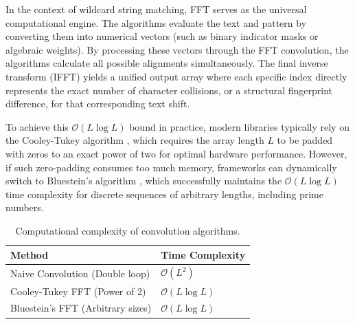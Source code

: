 In the context of wildcard string matching, FFT serves as the universal computational engine. The algorithms evaluate the text and pattern by converting them into numerical vectors (such as binary indicator masks or algebraic weights). By processing these vectors through the FFT convolution, the algorithms calculate all possible alignments simultaneously. The final inverse transform (IFFT) yields a unified output array where each specific index directly represents the exact number of character collisions, or a structural fingerprint difference, for that corresponding text shift.

To achieve this $\mathcal{O}(L \log L)$ bound in practice, modern libraries typically rely on the Cooley-Tukey algorithm \cite{cooley1965algorithm}, which requires the array length $L$ to be padded with zeros to an exact power of two for optimal hardware performance. However, if such zero-padding consumes too much memory, frameworks can dynamically switch to Bluestein's algorithm \cite{bluestein1970linear}, which successfully maintains the $\mathcal{O}(L \log L)$ time complexity for discrete sequences of arbitrary lengths, including prime numbers.

\begin{table}[htbp]
\centering
\caption{Computational complexity of convolution algorithms.}
\begin{tabular}{ll}
\toprule
\textbf{Method} & \textbf{Time Complexity} \\
\midrule
Naive Convolution (Double loop) & $\mathcal{O}(L^2)$ \\
Cooley-Tukey FFT (Power of 2) & $\mathcal{O}(L \log L)$ \\
Bluestein's FFT (Arbitrary sizes) & $\mathcal{O}(L \log L)$ \\
\bottomrule
\end{tabular}
\end{table}